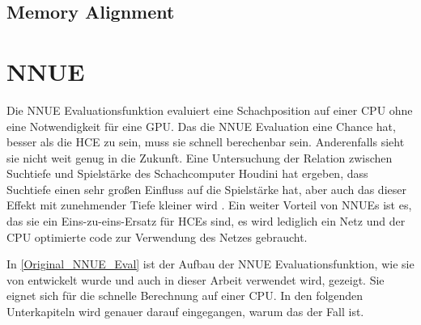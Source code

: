 \subsection{Memory Alignment}

\section{NNUE}

Die \ac{NNUE} Evaluationsfunktion evaluiert eine Schachposition auf einer CPU ohne eine Notwendigkeit für eine GPU. Das die \ac{NNUE} Evaluation eine Chance hat, besser als die \ac{HCE} zu sein, muss sie schnell berechenbar sein. Anderenfalls sieht sie nicht weit genug in die Zukunft. Eine Untersuchung der Relation zwischen Suchtiefe und Spielstärke des Schachcomputer Houdini \citeyear{Ferreira2013} hat ergeben, dass Suchtiefe einen sehr großen Einfluss auf die Spielstärke hat, aber auch das dieser Effekt mit zunehmender Tiefe kleiner wird \cite{Ferreira2013}. Ein weiter Vorteil von \acp{NNUE} ist es, das sie ein Eins-zu-eins-Ersatz für \acp{HCE} sind, es wird lediglich ein Netz und der CPU optimierte code zur Verwendung des Netzes gebraucht.


In \autoref{Original_NNUE_Eval} ist der Aufbau der \ac{NNUE} Evaluationsfunktion, wie sie von \citeauthor{YNasu2018} \cite{YNasu2018} entwickelt wurde und auch in dieser Arbeit verwendet wird, gezeigt. Sie eignet sich für die schnelle Berechnung auf einer CPU. In den folgenden Unterkapiteln wird genauer darauf eingegangen, warum das der Fall ist.

